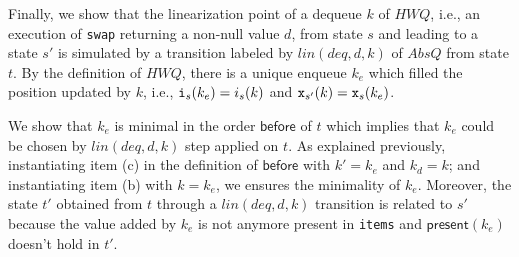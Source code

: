 Finally, we show that the linearization point of a dequeue $k$ of $\mathit{HWQ}$, i.e., an execution of {\tt swap} returning a non-null value $d$, from state $s$ and leading to a state $s'$ is simulated by a transition labeled by $lin(deq,d,k)$ of $AbsQ$ from state $t$. By the definition of $\mathit{HWQ}$, there is a unique enqueue $k_e$ which filled the position updated by $k$, i.e., ${\tt i}_s(k_e)=i_s(k)$ and ${\tt x}_{s'}(k)={\tt x}_s(k_e)$.

We show that $k_e$ is minimal in the order $\mathsf{before}$ of $t$ which implies that $k_e$ could be chosen by $lin(deq,d,k)$ step applied on $t$. As explained previously, instantiating item (c) in the definition of $\mathsf{before}$ with $k'=k_e$ and $k_d=k$; and instantiating item (b) with $k=k_e$, we ensures the minimality of $k_e$. Moreover, the state $t'$ obtained from $t$ through a $lin(deq,d,k)$ transition is related to $s'$ because the value added by $k_e$ is not anymore present in {\tt items} and $\mathsf{present}(k_e)$ doesn't hold in $t'$.
%
%
